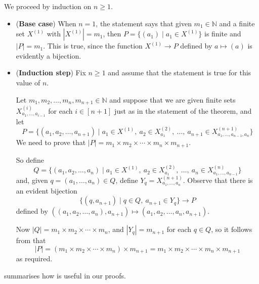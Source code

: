 \begin{cproof}
We proceed by induction on $n \ge 1$.
\begin{itemize}
\item (\textbf{Base case}) When $n=1$, the statement says that given $m_1 \in \mathbb{N}$ and a finite set $X^{(1)}$ with $|X^{(1)}|=m_1$, then $P = \{ (a_1) \mid a_1 \in X^{(1)} \}$ is finite and $|P| = m_1$. This is true, since the function $X^{(1)} \to P$ defined by $a \mapsto (a)$ is evidently a bijection.

\item (\textbf{Induction step}) Fix $n \ge 1$ and assume that the statement is true for this value of $n$.

Let $m_1, m_2, \dots, m_n, m_{n+1} \in \mathbb{N}$ and suppose that we are given finite sets $X^{(i)}_{a_1,\dots,a_{i-1}}$ for each $i \in [n+1]$ just as in the statement of the theorem, and let
\[ P = \{ (a_1,a_2,\dots,a_{n+1}) \mid a_1 \in X^{(1)}, ~ a_2 \in X^{(2)}_{a_1}, ~ \dots, ~ a_{n+1} \in X^{(n+1)}_{a_1,\dots,a_{n-1},a_n} \} \]
We need to prove that $|P| = m_1 \times m_2 \times \cdots \times m_n \times m_{n+1}$.

So define
\[ Q = \{ (a_1,a_2,\dots,a_n) \mid a_1 \in X^{(1)}, ~ a_2 \in X^{(2)}_{a_1}, ~ \dots, ~ a_n \in X^{(n)}_{a_1,\dots,a_{n-1}} \} \]
and, given $q = (a_1,\dots,a_n) \in Q$, define $Y_q = X^{(n+1)}_{a_1,\dots,a_n}$. Observe that there is an evident bijection
\[ \{ (q,a_{n+1}) \mid q \in Q, ~ a_{n+1} \in Y_{q} \} \to P \]
defined by $((a_1,a_2,\dots,a_n),a_{n+1}) \mapsto (a_1,a_2,\dots,a_n,a_{n+1})$.

Now $|Q|=m_1 \times m_2 \times \cdots \times m_n$, and $|Y_q| = m_{n+1}$ for each $q \in Q$, so it follows from  that
\[ |P| = (m_1 \times m_2 \times \cdots \times m_n) \times m_{n+1} = m_1 \times m_2 \times \cdots \times m_n \times m_{n+1} \]
as required.
\end{itemize}
\end{cproof}

 summarises how  is useful in our proofs.


